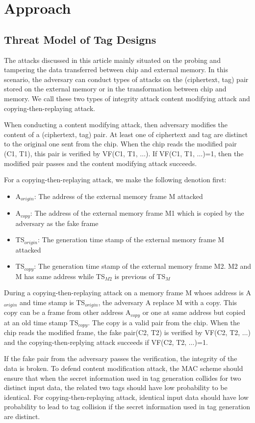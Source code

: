 \documentclass{article}
\begin{document}
\section{Approach}
\subsection{Threat Model of Tag Designs}
The attacks discussed in this article mainly situated on the probing and
tampering the data transferred between chip and external memory. In this scenario, the adversary can conduct types of attacks on the (ciphertext, tag) pair stored on the external memory or in the transformation between chip and memory. We call these two types of integrity attack content modifying attack and copying-then-replaying attack. 

When conducting a content modifying attack, then adversary modifies the content of a (ciphertext, tag) pair. At least one of ciphertext and tag are distinct to the original one sent from the chip. When the chip reads the modified pair (C1, T1), this pair is verified by VF(C1, T1, $\ldots$). If VF(C1, T1, $\ldots$)=1, then the modified pair passes and the content modifying attack succeeds. 

For a copying-then-replaying attack, we make the following denotion first:
\begin{itemize}
	\item A$_{origin}$: The address of the external memory frame M attacked 
	\item A$_{copy}$: The address of the external memory frame M1 which is copied by the adversary as the fake frame
	\item TS$_{origin}$: The generation time stamp of the external memory frame M attacked
	\item TS$_{copy}$: The generation time stamp of the external memory frame M2. M2 and M has same address while TS$_{M2}$ is previous of TS$_M$ 
\end{itemize}
During a copying-then-replaying attack on a memory frame M whoes address is A$_{origin}$ and time stamp is TS$_{origin}$, the adversary A replace M with a copy. This copy can be a frame from other address A$_{copy}$ or one at same address but copied at an old time stamp TS$_{copy}$. The copy is a valid pair from the chip. 
When the chip reads the modified frame, the fake pair(C2, T2) is verified by VF(C2, T2, $\ldots$) and the copying-then-replying attack succeeds if VF(C2, T2, $\ldots$)=1.  

If the fake pair from the adversary passes the verification, the integrity of the data is broken. To defend content modification attack, the MAC scheme should ensure that when the secret information used in tag generation collides for two distinct input data, the related two tags should have low probability to be identical. For copying-then-replaying attack, identical input data should have low probability to lead to tag collision if the secret information used in tag generation are distinct. 
\end{document}
